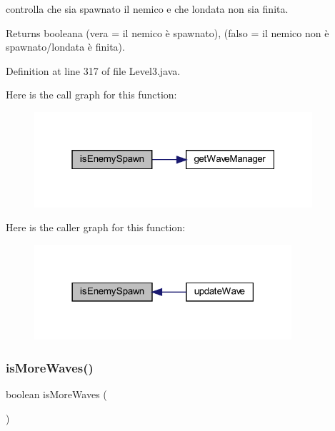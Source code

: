 controlla che sia spawnato il nemico e che l\textquotesingle{}ondata non sia finita. 

\begin{DoxyReturn}{Returns}
booleana (vera = il nemico è spawnato), (falso = il nemico non è spawnato/l\textquotesingle{}ondata è finita). 
\end{DoxyReturn}


Definition at line 317 of file Level3.\+java.

Here is the call graph for this function\+:\nopagebreak
\begin{figure}[H]
\begin{center}
\leavevmode
\includegraphics[width=292pt]{classscenes_1_1_level3_a121827ebd1c5b24c92f966721b51c0b9_cgraph}
\end{center}
\end{figure}
Here is the caller graph for this function\+:\nopagebreak
\begin{figure}[H]
\begin{center}
\leavevmode
\includegraphics[width=270pt]{classscenes_1_1_level3_a121827ebd1c5b24c92f966721b51c0b9_icgraph}
\end{center}
\end{figure}
\mbox{\label{classscenes_1_1_level3_a999f12a033f49f299ad7f55bcae24447}} 
\subsubsection{\texorpdfstring{is\+More\+Waves()}{isMoreWaves()}}
{\footnotesize\ttfamily boolean is\+More\+Waves (\begin{DoxyParamCaption}{ }\end{DoxyParamCaption})\hspace{0.3cm}{\ttfamily [private]}}



